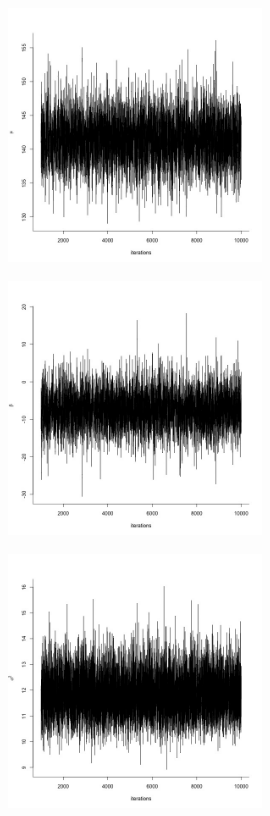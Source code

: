 \documentclass[11pt]{article}
\begin{document}
\begin{enumerate}[(A)]
\begin{figure}[h]
    \centering
    \includegraphics[width=0.6\textwidth]{Ex4/figures/2mu_tra.jpeg}
\end{figure}
\begin{figure}[h]
    \centering
    \includegraphics[width=0.6\textwidth]{Ex4/figures/2beta_tra.jpeg}
\end{figure}
\begin{figure}[h]
    \centering
    \includegraphics[width=0.6\textwidth]{Ex4/figures/2sig_tra.jpeg}

\end{figure}
\end{enumerate}
\end{document}
